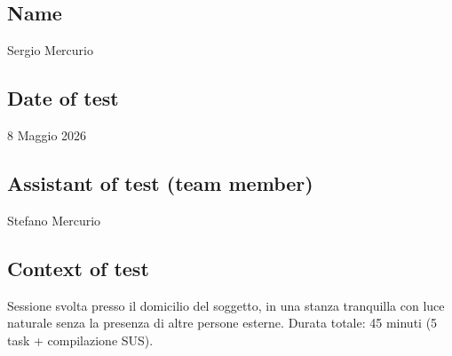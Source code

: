 ﻿\documentclass[11pt,a4paper]{article}
\begin{document}
\vspace{0.5cm}

\subsection*{Name}
\begin{tcolorbox}[base]
Sergio Mercurio
\end{tcolorbox}

\subsection*{Date of test}
\begin{tcolorbox}[base]
8 Maggio 2026
\end{tcolorbox}

\subsection*{Assistant of test (team member)}
\begin{tcolorbox}[base]
Stefano Mercurio
\end{tcolorbox}

\subsection*{Context of test}
\begin{tcolorbox}[base]
Sessione svolta presso il domicilio del soggetto, in una
stanza tranquilla con luce naturale senza la presenza di altre persone esterne. Durata totale: 45
minuti (5 task + compilazione SUS).
\end{tcolorbox}
\end{document}
